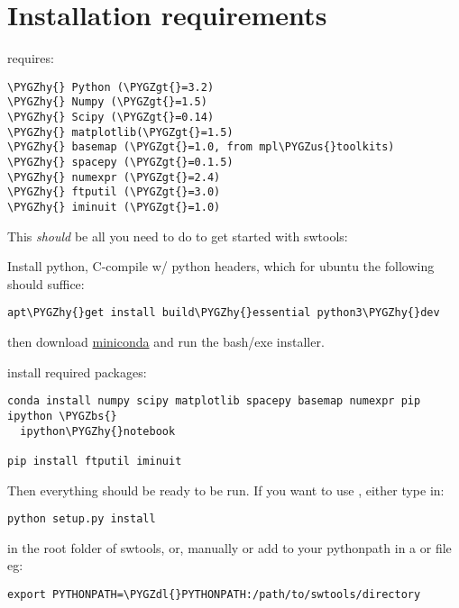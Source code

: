 \documentclass[letterpaper,10pt,english]{sphinxhowto}
\def\PYGZbs{\char`\\}
\def\PYGZus{\char`\_}
\def\PYGZgt{\char`\>}
\def\PYGZdl{\char`\$}
\def\PYGZhy{\char`\-}
\begin{document}
\section{Installation requirements}
\label{install::doc}\label{install:installation-requirements}
 requires:

\begin{Verbatim}[commandchars=\\\{\}]
\PYGZhy{} Python (\PYGZgt{}=3.2)
\PYGZhy{} Numpy (\PYGZgt{}=1.5)
\PYGZhy{} Scipy (\PYGZgt{}=0.14)
\PYGZhy{} matplotlib(\PYGZgt{}=1.5)
\PYGZhy{} basemap (\PYGZgt{}=1.0, from mpl\PYGZus{}toolkits)
\PYGZhy{} spacepy (\PYGZgt{}=0.1.5)
\PYGZhy{} numexpr (\PYGZgt{}=2.4)
\PYGZhy{} ftputil (\PYGZgt{}=3.0)
\PYGZhy{} iminuit (\PYGZgt{}=1.0)
\end{Verbatim}

This \emph{should} be all you need to do to get started with swtools:

Install python, C-compile w/ python headers, which for ubuntu the following should suffice:

\begin{Verbatim}[commandchars=\\\{\}]
apt\PYGZhy{}get install build\PYGZhy{}essential python3\PYGZhy{}dev
\end{Verbatim}

then download \href{http://conda.pydata.org/miniconda.html}{miniconda} and run the bash/exe installer.

install required packages:

\begin{Verbatim}[commandchars=\\\{\}]
conda install numpy scipy matplotlib spacepy basemap numexpr pip ipython \PYGZbs{}
  ipython\PYGZhy{}notebook

pip install ftputil iminuit
\end{Verbatim}

Then everything should be ready to be run. If you want to use , either type in:

\begin{Verbatim}[commandchars=\\\{\}]
python setup.py install
\end{Verbatim}

in the root folder of swtools, or, manually or add  to your pythonpath in a  or  file eg:

\begin{Verbatim}[commandchars=\\\{\}]
export PYTHONPATH=\PYGZdl{}PYTHONPATH:/path/to/swtools/directory
\end{Verbatim}
\end{document}
